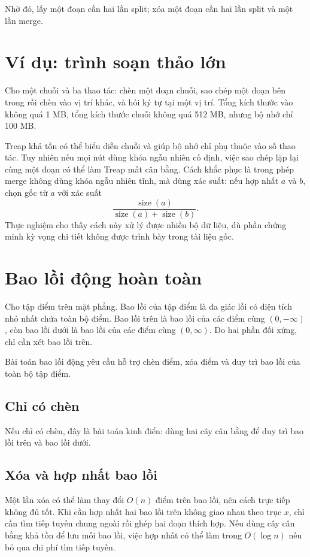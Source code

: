 \documentclass[11pt]{article}
\begin{document}
Nhờ đó, lấy một đoạn cần hai lần split; xóa một đoạn cần hai lần split
và một lần merge.

\section{Ví dụ: trình soạn thảo lớn}

Cho một chuỗi và ba thao tác: chèn một đoạn chuỗi, sao chép một đoạn
bên trong rồi chèn vào vị trí khác, và hỏi ký tự tại một vị trí. Tổng
kích thước vào không quá 1 MB, tổng kích thước chuỗi không quá 512 MB,
nhưng bộ nhớ chỉ 100 MB.

Treap khả tồn có thể biểu diễn chuỗi và giúp bộ nhớ chỉ phụ thuộc vào
số thao tác. Tuy nhiên nếu mọi nút dùng khóa ngẫu nhiên cố định, việc
sao chép lặp lại cùng một đoạn có thể làm Treap mất cân bằng. Cách
khắc phục là trong phép merge không dùng khóa ngẫu nhiên tĩnh, mà dùng
xác suất: nếu hợp nhất $a$ và $b$, chọn gốc từ $a$ với xác suất
\[
  \frac{\operatorname{size}(a)}{\operatorname{size}(a)+\operatorname{size}(b)}.
\]
Thực nghiệm cho thấy cách này xử lý được nhiều bộ dữ liệu, dù phần
chứng minh kỳ vọng chi tiết không được trình bày trong tài liệu gốc.

\section{Bao lồi động hoàn toàn}

Cho tập điểm trên mặt phẳng. Bao lồi của tập điểm là đa giác lồi có
diện tích nhỏ nhất chứa toàn bộ điểm. Bao lồi trên là bao lồi của các
điểm cùng $(0,-\infty)$, còn bao lồi dưới là bao lồi của các điểm cùng
$(0,\infty)$. Do hai phần đối xứng, chỉ cần xét bao lồi trên.

Bài toán bao lồi động yêu cầu hỗ trợ chèn điểm, xóa điểm và duy trì
bao lồi của toàn bộ tập điểm.

\subsection{Chỉ có chèn}

Nếu chỉ có chèn, đây là bài toán kinh điển: dùng hai cây cân bằng để
duy trì bao lồi trên và bao lồi dưới.

\subsection{Xóa và hợp nhất bao lồi}

Một lần xóa có thể làm thay đổi $O(n)$ điểm trên bao lồi, nên cách trực
tiếp không đủ tốt. Khi cần hợp nhất hai bao lồi trên không giao nhau
theo trục $x$, chỉ cần tìm tiếp tuyến chung ngoài rồi ghép hai đoạn
thích hợp. Nếu dùng cây cân bằng khả tồn để lưu mỗi bao lồi, việc hợp
nhất có thể làm trong $O(\log n)$ nếu bỏ qua chi phí tìm tiếp tuyến.
\end{document}
